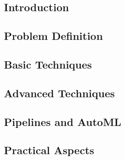 

\subsection{Introduction}


\subsection{Problem Definition}


\subsection{Basic Techniques}


\subsection{Advanced Techniques}


\subsection{Pipelines and AutoML}


\subsection{Practical Aspects}


